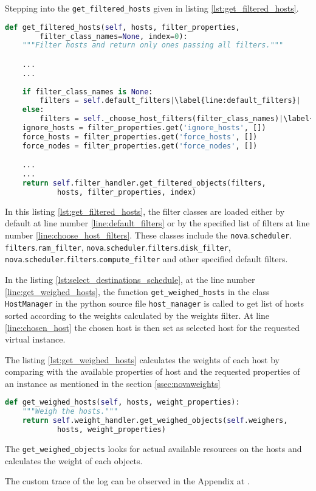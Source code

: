 Stepping into the \verb|get_filtered_hosts| given in listing \ref{lst:get_filtered_hosts}.
\newline
\begin{lstlisting}[frame=single, language=Python, caption={The function get\_filtered\_hosts}, label={lst:get_filtered_hosts}, escapechar=|]
def get_filtered_hosts(self, hosts, filter_properties,
		filter_class_names=None, index=0):
	"""Filter hosts and return only ones passing all filters."""

	...
	...
	
	if filter_class_names is None:
		filters = self.default_filters|\label{line:default_filters}|
	else:
		filters = self._choose_host_filters(filter_class_names)|\label{line:choose_host_filters}|
	ignore_hosts = filter_properties.get('ignore_hosts', [])
	force_hosts = filter_properties.get('force_hosts', [])
	force_nodes = filter_properties.get('force_nodes', [])

	...
	...
	return self.filter_handler.get_filtered_objects(filters,
			hosts, filter_properties, index)
\end{lstlisting}

In this listing \ref{lst:get_filtered_hosts}, the filter classes are loaded either by default at line number \ref{line:default_filters} or by the specified list of filters at line number \ref{line:choose_host_filters}.
These classes include the \verb|nova|.\verb|scheduler|. \verb|filters|.\verb|ram_filter|, \verb|nova|.\verb|scheduler|.\verb|filters|.\verb|disk_filter|, \verb|nova|.\verb|scheduler|.\newline\verb|filters|.\verb|compute_filter| and other specified default filters.

In the listing \ref{lst:select_destinations_schedule}, at the line number \ref{line:get_weighed_hosts}, the function \verb|get_weighed_hosts| in the class \verb|HostManager| in the python source file \verb|host_manager| is called to get list of hosts sorted according to the weights calculated by the weights filter. At line \ref{line:chosen_host} the chosen host is then set as selected host for the requested virtual instance.

The listing \ref{lst:get_weighed_hosts} calculates the weights of each host by comparing with the available properties of host and the requested properties of an instance as mentioned in the section \ref{ssec:novaweights}
\begin{lstlisting}[frame=single, language=Python, caption={The function \_schedule}, label={lst:get_weighed_hosts}, escapechar=|]
def get_weighed_hosts(self, hosts, weight_properties):
	"""Weigh the hosts."""
	return self.weight_handler.get_weighed_objects(self.weighers,
			hosts, weight_properties)
\end{lstlisting}

The \verb|get_weighed_objects| looks for actual available resources on the hosts and calculates the weight of each objects.

The custom trace of the log can be observed in the Appendix  at .
